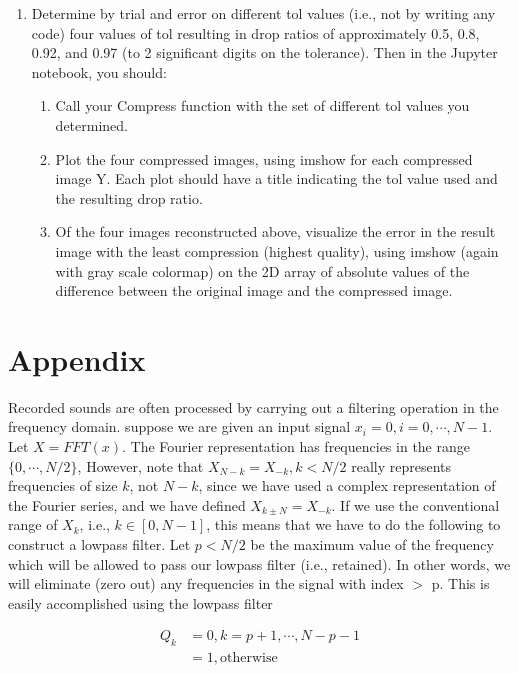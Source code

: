 \documentclass[11pt]{article}
\begin{document}
\begin{enumerate}
  \item Determine by trial and error on different tol values (i.e., not by writing any code) four values of tol resulting in drop ratios of approximately 0.5, 0.8, 0.92, and 0.97 (to 2 significant digits on the tolerance). Then in the Jupyter notebook, you should:
  
  \begin{enumerate}
    \item Call your Compress function with the set of different tol values you determined.
    \item Plot the four compressed images, using imshow for each compressed image Y. Each plot should have a title indicating the tol value used and the resulting drop ratio.
    \item Of the four images reconstructed above, visualize the error in the result image with the least compression (highest quality), using imshow (again with gray scale colormap) on the 2D array of absolute values of the difference between the original image and the compressed image.
  \end{enumerate}
\end{enumerate}

\newpage

\section{Appendix}

Recorded sounds are often processed by carrying out a filtering operation in the frequency domain. suppose we are given an input signal $x_i = 0, i=0, \cdots, N-1$. Let $X=FFT(x)$. The Fourier representation has frequencies in the range $\{0, \cdots, N/2\}$, However, note that $X_{N-k} = X_{-k}, k < N/2$ really represents frequencies of size $k$, not $N-k$, since we have used a complex representation of the Fourier series, and we have defined $X_{k \pm N} = X_{-k}$.
If we use the conventional range of $X_{k}$, i.e., $k \in [0, N - 1]$, this means that we have to do the following to construct a lowpass filter. Let $p < N/2$ be the maximum value of the frequency which will be allowed to pass our lowpass filter (i.e., retained). In other words, we will eliminate (zero out) any frequencies in the signal with index $>$ p. This is easily accomplished using the lowpass filter

\begin{align*}
  Q_k &= 0, k = p + 1, \cdots, N - p - 1 \\
  &= 1, \text{otherwise} \\
\end{align*}
\end{document}
